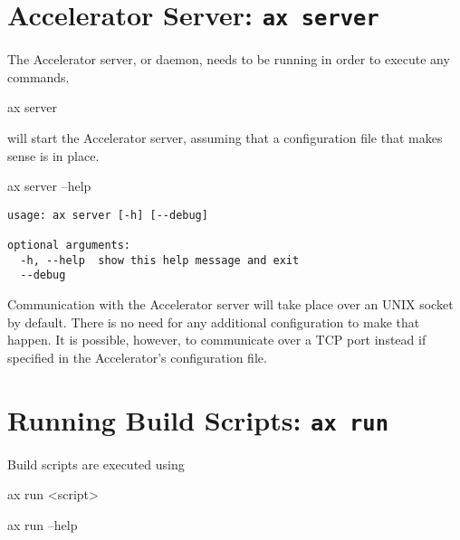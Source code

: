 \section{Accelerator Server: \texttt{ax server}}

The Accelerator server, or daemon, needs to be running in order to
execute any commands.
\begin{shell}
ax server
\end{shell}
will start the Accelerator server, assuming that a configuration file
that makes sense is in place.
\begin{shell}
ax server --help
\end{shell}
\begin{snugshade}
\begin{verbatim}
usage: ax server [-h] [--debug]

optional arguments:
  -h, --help  show this help message and exit
  --debug
\end{verbatim}%
\end{snugshade}
Communication with the Accelerator server will take place over an UNIX
socket by default.  There is no need for any additional configuration
to make that happen.  It is possible, however, to communicate over a
TCP port instead if specified in the Accelerator's configuration file.





\section{Running Build Scripts: \texttt{ax run}}
\label{sec:exec_runner}
Build scripts are executed using
\begin{python}
ax run <script>
\end{python}

\begin{python}
ax run --help
\end{python}

